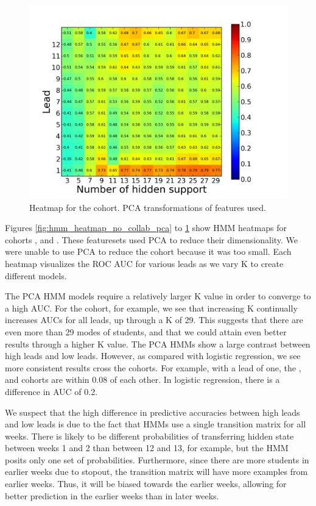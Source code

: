 \begin{figure}[ht!]
  \caption{Heatmap for the \both cohort. PCA transformations of features used.}\label{fig:hmm_heatmap_forum_and_wiki_pca}
  \centering
    \includegraphics[width=1.0\textwidth]{figures/hmm/forum_and_wiki_pca.png}
\end{figure}

Figures \ref{fig:hmm_heatmap_no_collab_pca} to \ref{fig:hmm_heatmap_forum_and_wiki_pca} show HMM heatmaps for cohorts \neither, \forum and \both. These featuresets used PCA to reduce their dimensionality. We were unable to use PCA to reduce the \wiki cohort because it was too small. Each heatmap visualizes the ROC AUC for various leads as we vary K to create different models.

The PCA HMM models require a relatively larger K value in order to converge to a high AUC. For the \neither cohort, for example, we see that increasing K continually increases AUCs for all leads, up through a K of 29. This suggests that there are even more than 29 modes of students, and that we could attain even better results through a higher K value. The PCA HMMs show a large contrast between high leads and low leads. However, as compared with logistic regression, we see more consistent results cross the cohorts. For example, with a lead of one, the \neither, \forum and \both cohorts are within 0.08 of each other. In logistic regression, there is a difference in AUC of 0.2.

We suspect that the high difference in predictive accuracies between high leads and low leads is due to the fact that HMMs use a single transition matrix for all weeks. There is likely to be different probabilities of transferring hidden state between weeks 1 and 2 than between 12 and 13, for example, but the HMM posits only one set of probabilities. Furthermore, since there are more students in earlier weeks due to stopout, the transition matrix will have more examples from earlier weeks. Thus, it will be biased towards the earlier weeks, allowing for better prediction in the earlier weeks than in later weeks. 

